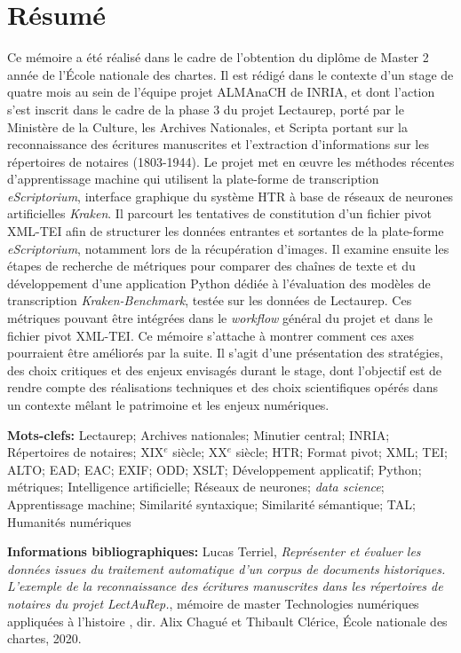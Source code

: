 \chapter*{Résumé}
Ce mémoire a été réalisé dans le cadre de l'obtention du diplôme de Master 2 année  de l'École nationale des chartes. 
Il est rédigé dans le contexte d'un stage de quatre mois au sein de l'équipe projet ALMAnaCH de INRIA, et dont l'action s'est inscrit dans le cadre de la phase 3 du projet Lectaurep, porté par le Ministère de la Culture, les Archives Nationales, et Scripta portant sur la reconnaissance des écritures manuscrites et l'extraction d'informations sur les répertoires de notaires (1803-1944). Le projet met en \oe{}uvre les méthodes récentes d'apprentissage machine qui utilisent la plate-forme de transcription \textit{eScriptorium}, interface graphique du système HTR à base de réseaux de neurones artificielles \textit{Kraken}. Il parcourt les tentatives de constitution d'un fichier pivot XML-TEI afin de structurer les données entrantes et sortantes de la plate-forme \textit{eScriptorium}, notamment lors de la récupération d'images. Il examine ensuite les étapes de recherche de métriques pour comparer des chaînes de texte et du développement d'une application Python dédiée à l'évaluation des modèles de transcription \textit{Kraken-Benchmark}, testée sur les données de Lectaurep. Ces métriques pouvant être intégrées dans le \textit{workflow} général du projet et dans le fichier pivot XML-TEI. Ce mémoire s'attache à montrer comment ces axes pourraient être améliorés par la suite. Il s'agit d'une présentation des stratégies, des choix critiques et des enjeux envisagés durant le stage, dont l'objectif est de rendre compte des réalisations techniques et des choix scientifiques opérés dans un contexte mêlant le patrimoine et les enjeux numériques. 

\bigskip
\textbf{Mots-clefs:} Lectaurep; Archives nationales; Minutier central; INRIA; Répertoires de notaires; XIX$^{e}$ siècle; XX$^{e}$ siècle; HTR; Format pivot; XML; TEI; ALTO; EAD; EAC; EXIF; ODD; XSLT; Développement applicatif; Python; métriques; Intelligence artificielle; Réseaux de neurones; \textit{data science}; Apprentissage machine; Similarité syntaxique; Similarité sémantique; TAL; Humanités numériques

\bigskip
\textbf{Informations bibliographiques:} Lucas Terriel, \textit{Représenter et évaluer les données issues du traitement automatique d'un corpus de documents historiques. L'exemple de la reconnaissance des écritures manuscrites dans les répertoires de notaires du projet LectAuRep.}, mémoire de master \og Technologies numériques appliquées à l'histoire \fg{}, dir. Alix Chagué et Thibault Clérice, École nationale des chartes, 2020.

\clearpage
\thispagestyle{empty}
\cleardoublepage